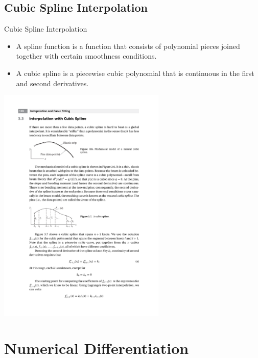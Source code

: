 \documentclass{beamer}
\begin{document}
\subsection[Cubic Spline Interpolation]{Cubic Spline Interpolation}
\begin{frame}{Cubic Spline Interpolation}
\begin{itemize}
  \item A \alert{spline function} is a function that consists of polynomial pieces
   joined together with certain smoothness conditions.
  \item A cubic spline is a piecewise cubic polynomial that is continuous in the first and second derivatives.
\end{itemize}
\centerline{\includegraphics[width=0.6\textwidth]{Lec9_Fig6.pdf}}
\end{frame}

\section[Numerical Differentiation]{Numerical Differentiation}
\end{document}
